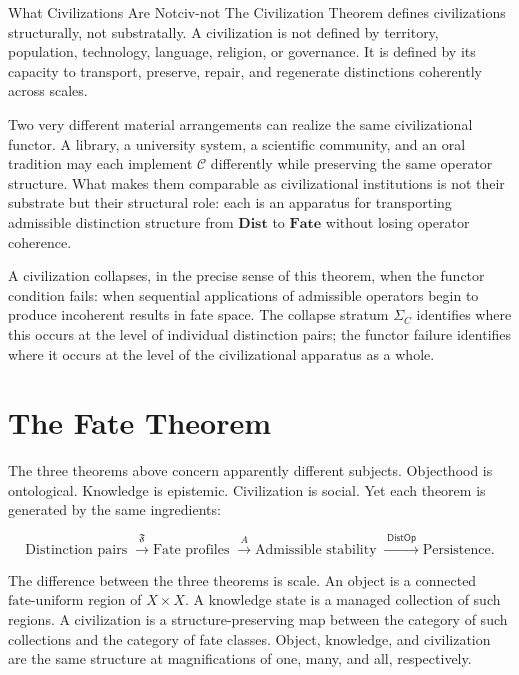 \documentclass[12pt,twoside,openright]{book}
\newcommand{\fateMap}{\mathfrak{F}}
\newcommand{\distOp}{\mathsf{DistOp}}
\newcommand{\strataC}{\Sigma_{C}}   %
\newcommand{\admRegion}{A}
\newcommand{\fateUnif}{\text{fate-uniform}}
\newcommand{\catDist}{\mathbf{Dist}}
\newcommand{\catFate}{\mathbf{Fate}}
\newcommand{\civFunc}{\mathcal{C}}
\providecommand{\strataC}{\Sigma_{C}}
\providecommand{\admRegion}{A}
\providecommand{\fateUnif}{\text{fate-uniform}}
\providecommand{\catDist}{\mathbf{Dist}}
\providecommand{\catFate}{\mathbf{Fate}}
\providecommand{\civFunc}{\mathcal{C}}
\begin{document}
\begin{remark}{What Civilizations Are Not}{civ-not}
The Civilization Theorem defines civilizations structurally,
not substratally. A civilization is not defined by territory,
population, technology, language, religion, or governance.
It is defined by its capacity to transport, preserve, repair,
and regenerate distinctions coherently across scales.

Two very different material arrangements can realize the same
civilizational functor. A library, a university system, a
scientific community, and an oral tradition may each implement
$\civFunc$ differently while preserving the same operator
structure. What makes them comparable as civilizational
institutions is not their substrate but their structural role:
each is an apparatus for transporting admissible distinction
structure from $\catDist$ to $\catFate$ without losing
operator coherence.

A civilization collapses, in the precise sense of this theorem,
when the functor condition fails: when sequential applications
of admissible operators begin to produce incoherent results in
fate space. The collapse stratum $\strataC$ identifies where
this occurs at the level of individual distinction pairs; the
functor failure identifies where it occurs at the level of the
civilizational apparatus as a whole.
\end{remark}

\section{The Fate Theorem}

The three theorems above concern apparently different subjects.
Objecthood is ontological. Knowledge is epistemic.
Civilization is social. Yet each theorem is generated by the
same ingredients:

\[
  \text{Distinction pairs}
  \;\xrightarrow{\;\fateMap\;}
  \text{Fate profiles}
  \;\xrightarrow{\;\admRegion\;}
  \text{Admissible stability}
  \;\xrightarrow{\;\distOp\;}
  \text{Persistence.}
\]

The difference between the three theorems is scale. An object
is a connected $\fateUnif$ region of $X\times X$. A knowledge
state is a managed collection of such regions. A civilization
is a structure-preserving map between the category of such
collections and the category of fate classes. Object, knowledge,
and civilization are the same structure at magnifications of
one, many, and all, respectively.
\end{document}
